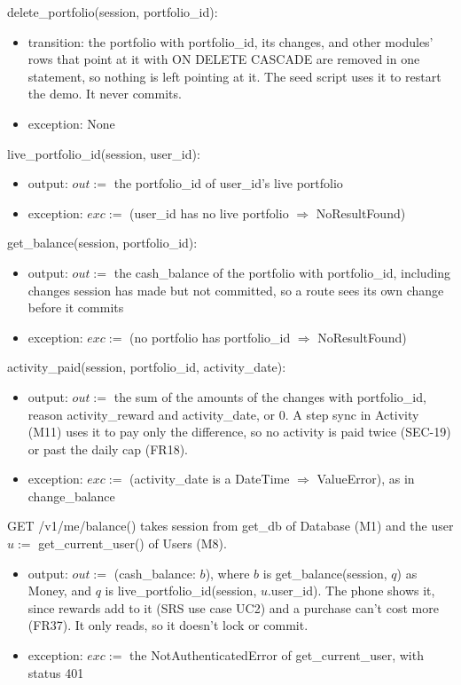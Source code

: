 \documentclass[12pt, titlepage]{article}
\begin{document}
\noindent delete\_portfolio(session, portfolio\_id):
\begin{itemize}
\item transition: the portfolio with portfolio\_id, its changes, and other
  modules' rows that point at it with ON DELETE CASCADE are removed in one
  statement, so nothing is left pointing at it. The seed script uses it to
  restart the demo. It never commits.
\item exception: None
\end{itemize}

\noindent live\_portfolio\_id(session, user\_id):
\begin{itemize}
\item output: $out :=$ the portfolio\_id of user\_id's live portfolio
\item exception: $exc :=$ (user\_id has no live portfolio $\Rightarrow$
  NoResultFound)
\end{itemize}

\noindent get\_balance(session, portfolio\_id):
\begin{itemize}
\item output: $out :=$ the cash\_balance of the portfolio with portfolio\_id,
  including changes session has made but not committed, so a route sees its
  own change before it commits
\item exception: $exc :=$ (no portfolio has portfolio\_id $\Rightarrow$
  NoResultFound)
\end{itemize}

\noindent activity\_paid(session, portfolio\_id, activity\_date):
\begin{itemize}
\item output: $out :=$ the sum of the amounts of the changes with
  portfolio\_id, reason \mbox{activity\_reward} and activity\_date, or 0.
  A step sync in Activity (M11) uses it to pay only
  the difference, so no activity is paid twice (SEC-19) or past the daily cap
  (FR18).
\item exception: $exc :=$ (activity\_date is a DateTime $\Rightarrow$
  ValueError), as in change\_balance
\end{itemize}

\noindent GET /v1/me/balance() takes session from get\_db of Database (M1)
and the user $u :=$ get\_current\_user() of Users (M8).
\begin{itemize}
\item output: $out :=$ (cash\_balance: $b$), where $b$ is get\_balance(session,
  $q$) as Money, and $q$ is live\_portfolio\_id(session, $u$.user\_id). The
  phone shows it, since rewards add to it (SRS use case UC2) and a purchase can't cost more
  (FR37). It only reads, so it doesn't lock or commit.
\item exception: $exc :=$ the NotAuthenticatedError of get\_current\_user, with
  status 401
\end{itemize}
\end{document}
